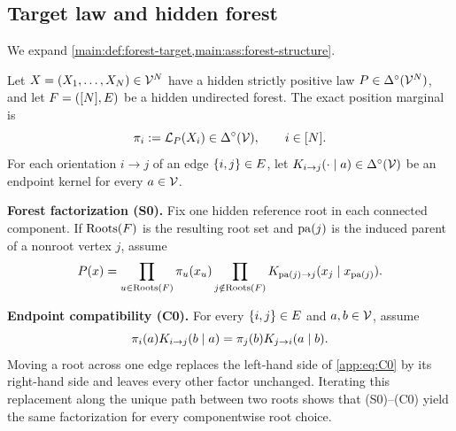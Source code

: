 \subsection{Target law and hidden forest}
\label{app:setup-target}

We expand \cref{main:def:forest-target,main:ass:forest-structure}.

\begin{definition}
\label{app:def:target-law}
Let $X=(X_1,\ldots,X_N)\in\mathcal V^N$ have a hidden strictly positive law
$P\in\Delta^\circ(\mathcal V^N)$, and let
$F=([N],E)$ be a hidden undirected forest.  The exact position
marginal is
\begin{equation}
 \pi_{i}:=\mathcal L_{P}(X_i)
 \in\Delta^\circ(\mathcal V),
 \qquad i\in[N].
 \label{app:eq:position-marginal}
\end{equation}
For each orientation $i\to j$ of an edge $\{i,j\}\in E$, let
$K_{i\to j}(\cdot\mid a)\in\Delta^\circ(\mathcal V)$ be an endpoint
kernel for every $a\in\mathcal V$.
\end{definition}

\begin{assumption}
\label{app:ass:forest-structure}
\textbf{Forest factorization (S0).}
Fix one hidden reference root in each connected component.  If
$\operatorname{Roots}(F)$ is the resulting root set and $\operatorname{pa}(j)$ is the
induced parent of a nonroot vertex $j$, assume
\begin{equation}
 P(x)
 =\prod_{u\in\operatorname{Roots}(F)}\pi_{u}(x_u)
  \prod_{j\notin\operatorname{Roots}(F)}
  K_{\operatorname{pa}(j)\to j}
  (x_j\mid x_{\operatorname{pa}(j)}).
 \label{app:eq:S0}
\end{equation}

\textbf{Endpoint compatibility (C0).}
For every $\{i,j\}\in E$ and $a,b\in\mathcal V$, assume
\begin{equation}
 \pi_{i}(a)K_{i\to j}(b\mid a)
 =\pi_{j}(b)K_{j\to i}(a\mid b).
 \label{app:eq:C0}
\end{equation}
Moving a root across one edge replaces the left-hand side of
\ref{app:eq:C0} by its right-hand side and leaves every other factor
unchanged.  Iterating this replacement along the unique path between two roots
shows that (S0)--(C0) yield the same factorization for every componentwise root
choice.
\end{assumption}

